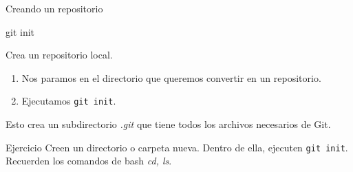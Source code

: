 \begin{frame}[t]{Creando un repositorio}
    \begin{comando}
        git init
    \end{comando}

    \pause
    \begin{block}{}
        Crea un repositorio local.
        \begin{enumerate}
            \item Nos paramos en el directorio que queremos convertir en un repositorio.
            \item Ejecutamos \texttt{git init}.
        \end{enumerate}
        Esto crea un subdirectorio \textit{.git} que tiene todos los archivos necesarios de Git.
    \end{block}
    \pause
    \begin{ejercicio}{Ejercicio}
        Creen un directorio o carpeta nueva. Dentro de ella, ejecuten \texttt{git init}. Recuerden los comandos de bash \textit{cd, ls}.
    \end{ejercicio}
\end{frame}

